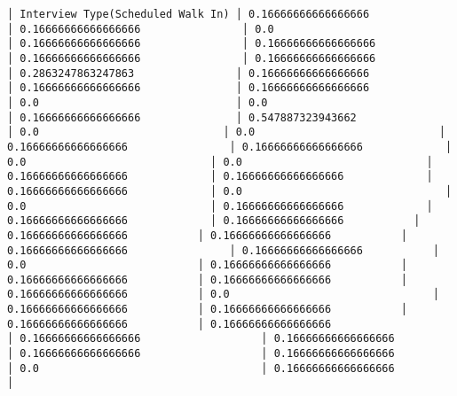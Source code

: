 \documentclass[11pt]{article}
\begin{document}
\begin{Verbatim}[commandchars=\\\{\}]
│ Interview Type(Scheduled Walk In) │ 0.16666666666666666                │ 0.16666666666666666                │ 0.0                                │ 0.16666666666666666                │ 0.16666666666666666                │ 0.16666666666666666                │ 0.16666666666666666                │ 0.2863247863247863                │ 0.16666666666666666               │ 0.16666666666666666               │ 0.16666666666666666                │ 0.0                               │ 0.0                               │ 0.16666666666666666               │ 0.547887323943662               │ 0.0                             │ 0.0                             │ 0.16666666666666666                │ 0.16666666666666666             │ 0.0                             │ 0.0                             │ 0.16666666666666666             │ 0.16666666666666666             │ 0.16666666666666666             │ 0.0                                │ 0.0                             │ 0.16666666666666666             │ 0.16666666666666666             │ 0.16666666666666666           │ 0.16666666666666666           │ 0.16666666666666666           │ 0.16666666666666666                │ 0.16666666666666666           │ 0.0                           │ 0.16666666666666666           │ 0.16666666666666666           │ 0.16666666666666666           │ 0.16666666666666666           │ 0.0                                │ 0.16666666666666666           │ 0.16666666666666666           │ 0.16666666666666666           │ 0.16666666666666666                   │ 0.16666666666666666                   │ 0.16666666666666666                   │ 0.16666666666666666                   │ 0.16666666666666666                   │ 0.0                                   │ 0.16666666666666666                   │

\end{Verbatim}
\end{document}
